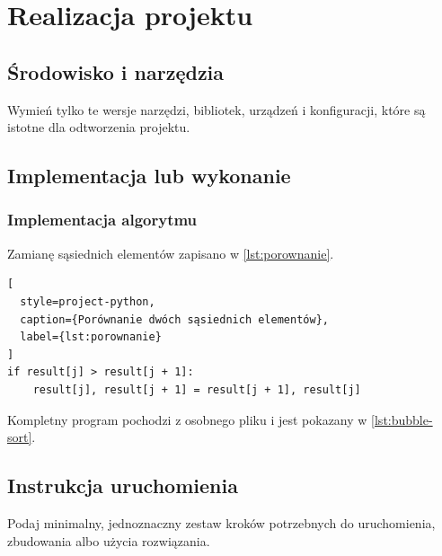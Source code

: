 \chapter{Realizacja projektu}
\label{chap:realizacja}

\section{Środowisko i narzędzia}
Wymień tylko te wersje narzędzi, bibliotek, urządzeń i konfiguracji, które są istotne dla odtworzenia projektu.

\section{Implementacja lub wykonanie}
\subsection{Implementacja algorytmu}

Zamianę sąsiednich elementów zapisano w \cref{lst:porownanie}.

\begin{lstlisting}[
  style=project-python,
  caption={Porównanie dwóch sąsiednich elementów},
  label={lst:porownanie}
]
if result[j] > result[j + 1]:
    result[j], result[j + 1] = result[j + 1], result[j]
\end{lstlisting}

Kompletny program pochodzi z osobnego pliku i jest pokazany
w \cref{lst:bubble-sort}.



\section{Instrukcja uruchomienia}
Podaj minimalny, jednoznaczny zestaw kroków potrzebnych do uruchomienia, zbudowania albo użycia rozwiązania.

% 
